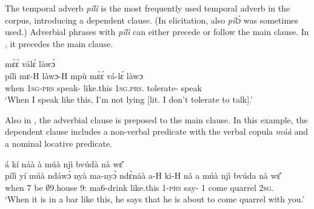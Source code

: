 

The temporal adverb {\itshape pílì} is the most frequently used temporal adverb  in the corpus, introducing a dependent clause. (In elicitation, also {\itshape pílɔ̀} was sometimes used.) Adverbial phrases with {\itshape pílì} can either precede or follow the main clause. In , it precedes the main clause.


\ea\label{pili1}
  \textsubscript{{\ADV}} mɛ̀ɛ́ válɛ́ làwɔ̀ \\ 
          {\db}pílì mɛ-H làwɔ-H mpù mɛ̀ɛ́ vá-lɛ́ làwɔ \\
           {\db}when 1\textsc{sg}-\textsc{prs} speak-{\R} like.this 1\textsc{sg}.\textsc{prs}.{\NEG} tolerate-{\NEG} speak  \\
    \trans `When I speak like this, I'm not lying [lit. I don't tolerate to talk].'
\z

Also in , the adverbial clause is preposed to the main clause. In this example, the dependent clause includes a non-verbal predicate with the verbal copula {\itshape múà} and a nominal locative predicate.


\ea\label{pili2}
  \textsubscript{{\ADV}} á kí náà à múà njì bvúdà nà wɛ̂\\
      {\db}pílì yí múà ndáwɔ̀ nyà ma-nyɔ̀ ndɛ̀náà a-H kì-H nâ a múà njì bvúda nà wɛ̂ \\
         {\db}when 7 be $\emptyset$9.house 9:{\ATT} ma6-drink like.this 1-\textsc{prs} say-{\R} {\COMP} 1 {\PROSP} come quarrel {\COM} 2\textsc{sg}.{\OBJ}  \\
    \trans `When it is in a bar like this, he says that he is about to come quarrel with you.'
\z

